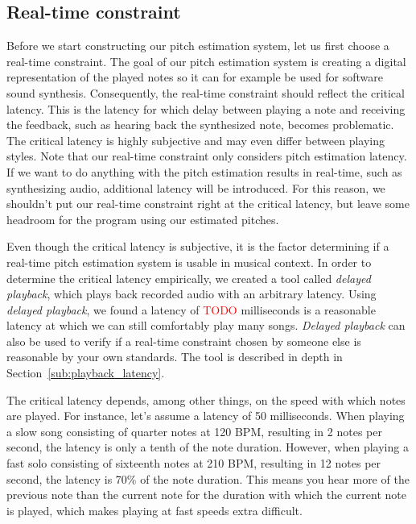 \documentclass[10pt,twocolumn]{article}
\begin{document}
\subsection{Real-time constraint}  \label{sec:constraint}
Before we start constructing our pitch estimation system, let us first choose a real-time constraint. The goal of our pitch estimation system is creating a digital representation of the played notes so it can for example be used for software sound synthesis. Consequently, the real-time constraint should reflect the critical latency. This is the latency for which delay between playing a note and receiving the feedback, such as hearing back the synthesized note, becomes problematic. The critical latency is highly subjective and may even differ between playing styles.
Note that our real-time constraint only considers pitch estimation latency. If we want to do anything with the pitch estimation results in real-time, such as synthesizing audio, additional latency will be introduced. For this reason, we shouldn't put our real-time constraint right at the critical latency, but leave some headroom for the program using our estimated pitches.

Even though the critical latency is subjective, it is the factor determining if a real-time pitch estimation system is usable in musical context. In order to determine the critical latency empirically, we created a tool called \textit{delayed playback}, which plays back recorded audio with an arbitrary latency. Using \textit{delayed playback}, we found a latency of \textcolor{red}{TODO} milliseconds is a reasonable latency at which we can still comfortably play many songs. \textit{Delayed playback} can also be used to verify if a real-time constraint chosen by someone else is reasonable by your own standards. The tool is described in depth in Section~\ref{sub:playback_latency}.%

The critical latency depends, among other things, on the speed with which notes are played. For instance, let's assume a latency of 50 milliseconds. When playing a slow song consisting of quarter notes at 120 BPM, resulting in 2 notes per second, the latency is only a tenth of the note duration. However, when playing a fast solo consisting of sixteenth notes at 210 BPM, resulting in 12 notes per second, the latency is 70\% of the note duration. This means you hear more of the previous note than the current note for the duration with which the current note is played, which makes playing at fast speeds extra difficult. %
\end{document}
